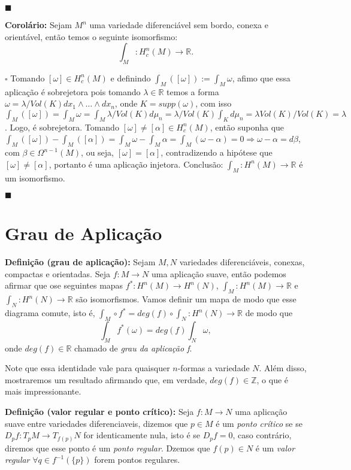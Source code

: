 \documentclass{article}
\begin{document}
	$\blacksquare$
	
	\textbf{Corolário:} Sejam $M^{n}$ uma variedade diferenciável sem bordo, conexa e orientável, então temos o seguinte isomorfismo:
 	$$
 	\int_{M} : H^{n}_{c}(M) \to \mathbb{R}.
 	$$
 	
 	$\square$ Tomando $[\omega] \in H^{n}_{c}(M)$ e definindo $\int_{M} ([\omega]) := \int_{M} \omega$, afimo que essa aplicação é sobrejetora pois tomando $\lambda \in \mathbb{R}$ temos a forma $\omega = \lambda/Vol(K) dx_{1} \wedge \dots \wedge dx_{n}$, onde $K = supp(\omega)$, com isso $\int_{M} ([\omega]) = \int_{M} \omega = \int_{M} \lambda/Vol(K)d\mu_{n} = \lambda/Vol(K)\int_{K} d\mu_{n} = \lambda Vol(K)/Vol(K) = \lambda$. Logo, é sobrejetora. Tomando $[\omega] \neq [\alpha] \in H^{n}_{c}(M)$, então suponha que $\int_{M} ([\omega]) - \int_{M}([\alpha])  = \int_{M} \omega - \int_{M} \alpha = \int_{M} (\omega - \alpha)= 0 \Rightarrow \omega - \alpha = d\beta$, com $\beta \in \Omega^{n-1}(M)$, ou seja, $[\omega] = [\alpha]$, contradizendo a hipótese que $[\omega] \neq [\alpha]$, portanto é uma aplicação injetora. Conclusão: $\int_{M} : H^{n}(M) \to \mathbb{R}$ é um isomorfismo. 
 	
 	$\blacksquare$
 	
 	\section{Grau de Aplicação}
 	
	\textbf{Definição (grau de aplicação):} Sejam $M,N$ variedades diferenciáveis, conexas, compactas e orientadas. Seja $f: M \to N$ uma aplicação suave, então podemos afirmar que ose seguintes mapas $f^{*}: H^{n}(M) \to H^{n}(N)$, $\int_{M}: H^{n}(M) \to \mathbb{R}$ e $\int_{N}: H^{n}(N) \to \mathbb{R}$ são isomorfismos. Vamos definir um mapa de modo que esse diagrama comute, isto é, $\int_{M} \circ f^{*} = deg(f) \circ \int_{N} :  H^{n}(N) \to \mathbb{R}$ de modo que
	$$
	\int_{M} f^{*}(\omega) = deg(f) \int_{N} \omega,
	$$
	onde $deg(f) \in \mathbb{R}$ chamado de \textit{grau da aplicação f}.
	
	Note que essa identidade vale para quaisquer $n$-formas a variedade $N$. Além disso, mostraremos um resultado afirmando que, em verdade, $deg(f) \in \mathbb{Z}$, o que é mais impressionante.
	
	\vspace{2 mm}
	\textbf{Definição (valor regular e ponto crítico):} Seja $f: M \to N$ uma aplicação suave entre variedades diferenciaveis, dizemos que $p \in M$ é um 
	\textit{ponto crítico} se se $D_{p}f : T_{p}M \to T_{f(p)}N$ for identicamente nula, isto é se $D_{p}f = 0$, caso contrário, diremos que esse ponto é um \textit{ponto regular}. Dzemos que $f(p) \in N$ é um \textit{valor regular} $\forall q \in f^{-1}(\{p\})$ forem pontos regulares.
	
\end{document}
